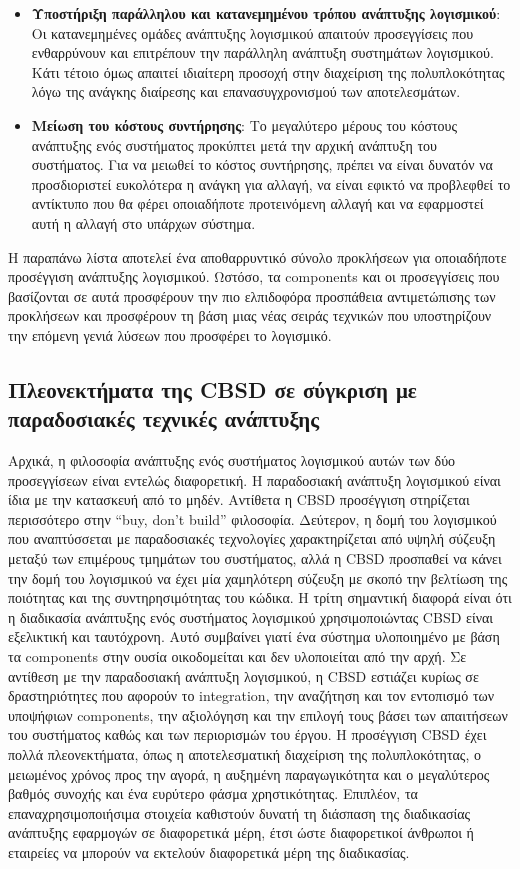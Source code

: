 \begin{itemize}
	\item{\textbf{Υποστήριξη παράλληλου και κατανεμημένου τρόπου ανάπτυξης λογισμικού}: Οι κατανεμημένες ομάδες ανάπτυξης λογισμικού απαιτούν προσεγγίσεις που ενθαρρύνουν και επιτρέπουν την παράλληλη ανάπτυξη συστημάτων λογισμικού. Κάτι τέτοιο όμως απαιτεί ιδιαίτερη προσοχή στην διαχείριση της πολυπλοκότητας λόγω της ανάγκης διαίρεσης και επανασυγχρονισμού των αποτελεσμάτων. }
	\item{\textbf{Μείωση του κόστους συντήρησης}: Το μεγαλύτερο μέρους του κόστους ανάπτυξης ενός συστήματος προκύπτει μετά την αρχική ανάπτυξη του συστήματος. Για να μειωθεί το κόστος συντήρησης, πρέπει να είναι δυνατόν να προσδιοριστεί ευκολότερα η ανάγκη για αλλαγή, να είναι εφικτό να προβλεφθεί το αντίκτυπο που θα φέρει οποιαδήποτε προτεινόμενη αλλαγή και να εφαρμοστεί αυτή η αλλαγή στο υπάρχων σύστημα. }
	
\end{itemize}

Η παραπάνω λίστα αποτελεί ένα αποθαρρυντικό σύνολο προκλήσεων για οποιαδήποτε προσέγγιση ανάπτυξης λογισμικού. Ωστόσο, τα components και οι προσεγγίσεις που βασίζονται σε αυτά προσφέρουν την πιο ελπιδοφόρα προσπάθεια αντιμετώπισης των προκλήσεων και προσφέρουν τη βάση μιας νέας σειράς τεχνικών που υποστηρίζουν την επόμενη γενιά λύσεων που προσφέρει το λογισμικό. 

\subsection{Πλεονεκτήματα της CBSD σε σύγκριση με παραδοσιακές τεχνικές ανάπτυξης}

Αρχικά, η φιλοσοφία ανάπτυξης ενός συστήματος λογισμικού αυτών των δύο προσεγγίσεων είναι εντελώς διαφορετική. Η παραδοσιακή ανάπτυξη λογισμικού είναι ίδια με την κατασκευή από το μηδέν. Αντίθετα η CBSD προσέγγιση στηρίζεται περισσότερο στην “buy, don’t build” φιλοσοφία. Δεύτερον, η δομή του λογισμικού που αναπτύσσεται με παραδοσιακές τεχνολογίες χαρακτηρίζεται από υψηλή σύζευξη μεταξύ των επιμέρους τμημάτων του συστήματος, αλλά η CBSD προσπαθεί να κάνει την δομή του λογισμικού να έχει μία χαμηλότερη σύζευξη με σκοπό την βελτίωση της ποιότητας και της συντηρησιμότητας του κώδικα. Η τρίτη σημαντική διαφορά είναι ότι η διαδικασία ανάπτυξης ενός συστήματος λογισμικού χρησιμοποιώντας CBSD είναι εξελικτική και ταυτόχρονη. Αυτό συμβαίνει γιατί ένα σύστημα υλοποιημένο με βάση τα components στην ουσία οικοδομείται και δεν υλοποιείται από την αρχή. Σε αντίθεση με την παραδοσιακή ανάπτυξη λογισμικού, η  CBSD εστιάζει κυρίως σε δραστηριότητες που αφορούν το integration, την αναζήτηση και τον εντοπισμό των υποψήφιων components, την αξιολόγηση και την επιλογή τους βάσει των απαιτήσεων του συστήματος καθώς και των περιορισμών του έργου. Η προσέγγιση CBSD έχει πολλά πλεονεκτήματα, όπως η αποτελεσματική διαχείριση της πολυπλοκότητας, ο μειωμένος χρόνος προς την αγορά, η αυξημένη παραγωγικότητα και ο μεγαλύτερος βαθμός συνοχής και ένα ευρύτερο φάσμα χρηστικότητας. Επιπλέον, τα επαναχρησιμοποιήσιμα στοιχεία καθιστούν δυνατή τη διάσπαση της διαδικασίας ανάπτυξης εφαρμογών σε διαφορετικά μέρη, έτσι ώστε διαφορετικοί άνθρωποι ή εταιρείες να μπορούν να εκτελούν διαφορετικά μέρη της διαδικασίας.


